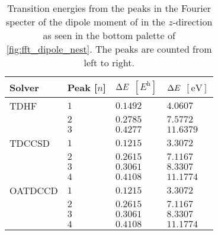         \begin{table}
            \centering
            \caption{Transition energies from the peaks in the Fourier specter
            of the dipole moment of  in the $z$-direction as seen in the
            bottom palette of \autoref{fig:fft_dipole_nest}.
            The peaks are counted from left to right.}
            \renewcommand{\arraystretch}{1.3}
            \begin{tabular}{@{}llll@{}}
                \toprule
                Solver & Peak [$n$] & $\Delta E$ $[\si{\hartree}]$
                & $\Delta E$ $[\si{\electronvolt}]$ \\
                \midrule
                TDHF & $1$ & $0.1492$ & $4.0607$ \\
                & $2$ & $0.2785$ & $7.5772$ \\
                & $3$ & $0.4277$ & $11.6379$ \\
                TDCCSD & $1$ & $0.1215$ & $3.3072$ \\
                & $2$ & $0.2615$ & $7.1167$ \\
                & $3$ & $0.3061$ & $8.3307$ \\
                & $4$ & $0.4108$ & $11.1774$ \\
                OATDCCD & $1$ & $0.1215$ & $3.3072$ \\
                & $2$ & $0.2615$ & $7.1167$ \\
                & $3$ & $0.3061$ & $8.3307$ \\
                & $4$ & $0.4108$ & $11.1774$ \\
                \bottomrule
            \end{tabular}
            \label{tab:fft_dipole_nest_z}
        \end{table}

